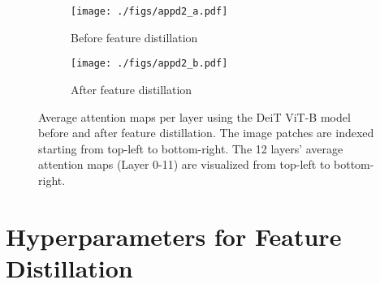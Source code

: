 \documentclass{article}
\begin{document}
\begin{figure}[h]
\centering
\begin{subfigure}{.48\textwidth}
  \centering
  \texttt{[image: ./figs/appd2\_a.pdf]}
  \caption{Before feature distillation}
  \label{fig:att_patterns_a}
\end{subfigure}
\begin{subfigure}{.48\textwidth}
  \centering
  \texttt{[image: ./figs/appd2\_b.pdf]}
  \caption{After feature distillation}
  \label{fig:att_patterns_b}
\end{subfigure}
    \caption{Average attention maps per layer using the DeiT ViT-B model before and after feature distillation. The image patches are indexed starting from top-left to bottom-right. The 12 layers' average attention maps (Layer 0-11) are visualized from top-left to bottom-right.}
    \label{fig:att_patterns_deit}
\end{figure}


\section{Hyperparameters for Feature Distillation}
\end{document}
